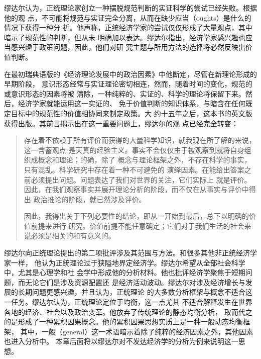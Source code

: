 缪达尔认为，正统理论家创立一种摆脱规范判断的实证科学的尝试已经失败。根据他的观
点，不可能将规范与实证完全分离，从而在缺少应当（oughts）是什么的情况下获得一种分
析。他声称，正统经济学家的尝试仅仅形成了大量观点，其中暗示了规范性的判断，但从未
明确加以表达。缪达尔指出，经济学家感兴趣也应当感兴趣于政策问题，因此，他们对研
究主题与所用方法的选择将必然反映出价值判断。

在最初瑞典语版的《经济理论发展中的政治因素》中他断定，尽管在新理论形成的早期阶段，
意识形态经常与实证理论密切相连，然而，随着时间的变化，规范的或意识形态的因素将被
清除，一种纯粹的、实证的、科学的理论将保留下来。然后，经济学家就能运用这一实证的、
免于价值判断的知识体系，与暗含在任何既定目标中的规范性的价值相协同来制定政策。大
约十五年之后，这本书的英文版获得出版。其前言揭示出在这一重要问题上，缪达尔的观
点已经完全转变：
\begin{quotation}
  存在着不依赖于所有评价而获得的大量科学知识，就我现在所了解的来说，这一含蓄观点
  是天真的经验主义。事实不会仅仅由于被观察到就将自身组织成概念和理论；的确，除了
  概念与理论框架之外，不存在科学的事实，只有混乱。科学研究中存在着一种不可避免的
  演绎因素。在能给出答案之前必须提出问题。问题表达了我们对世界的关注，它们实际上
  就是评价。因此，在我们观察事实并展开理论分析的阶段，而不仅在从事实与评价中得出
  政治推论的阶段，就已然涉及评价。

  因此，我得出关于下列必要性的结论，即从一开始到最后，总下以明确的价值前提来进行
  研究。价值前提不能任意确定；它们对于我们生活的社会来说必须是相关的和有意义的。
\end{quotation}

缪达尔向正统理论提出的第二项批评涉及其范围与方法。和很多其他非正统经济学家一样，
他认为正统理论过于狭隘地界定经济学。缪达尔希望从全部社会科学中，尤其是心理学和社
会学中形成他的分析材料。他也批评经济学聚焦于短期问题，而无论它们是涉及资源配置还
是经济活动波动。缪达尔对涉及经济增长与发展的长期问题更感兴趣，并且认为，正统理论
的大多数分析框架与概念不适合这一任务。缪达尔认为，正统理论定位于均衡，这一点尤其
不适合解释发生在世界各地的经济、社会以及政治变革。他放弃了传统理论的静态均衡分析，
取而代之的是形成了一种累积因果概念。他的累积因果思想实质上是一种一般动态均衡框架，
其中，一般（general）这一术语暗示着除了纯粹的经济因素之外，其他因素也进入分析中。
本章后面将以缪达尔对不发达经济学的分析为例来说明这一思想。

